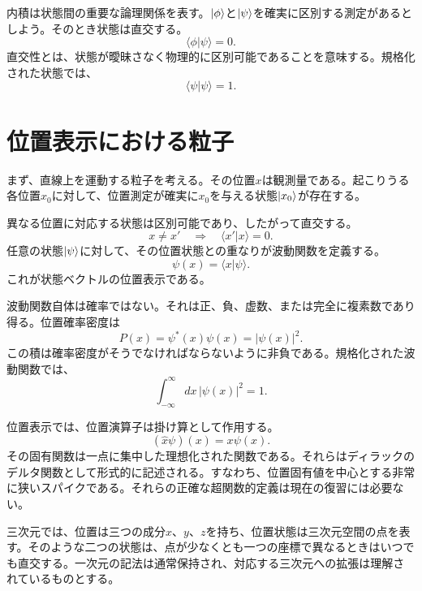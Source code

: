 内積は状態間の重要な論理関係を表す。\(\left\lvert\phi\right\rangle\)と\(\left\lvert\psi\right\rangle\)を確実に区別する測定があるとしよう。そのとき状態は直交する。
\begin{equation}
\langle\phi|\psi\rangle=0.
\end{equation}
直交性とは、状態が曖昧さなく物理的に区別可能であることを意味する。規格化された状態では、
\begin{equation}
\langle\psi|\psi\rangle=1.
\end{equation}

\section{位置表示における粒子}

まず、直線上を運動する粒子を考える。その位置\(x\)は観測量である。起こりうる各位置\(x_0\)に対して、位置測定が確実に\(x_0\)を与える状態\(\left\lvert x_0\right\rangle\)が存在する。

異なる位置に対応する状態は区別可能であり、したがって直交する。
\begin{equation}
x\neq x'
\quad\Longrightarrow\quad
\langle x'|x\rangle=0.
\end{equation}
任意の状態\(\left\lvert\psi\right\rangle\)に対して、その位置状態との重なりが波動関数を定義する。
\begin{equation}
\psi(x)=\langle x|\psi\rangle.
\end{equation}
これが状態ベクトルの位置表示である。

波動関数自体は確率ではない。それは正、負、虚数、または完全に複素数であり得る。位置確率密度は
\begin{equation}
P(x)=\psi^*(x)\psi(x)=|\psi(x)|^2.
\end{equation}
この積は確率密度がそうでなければならないように非負である。規格化された波動関数では、
\begin{equation}
\int_{-\infty}^{\infty}dx\,|\psi(x)|^2=1.
\end{equation}

位置表示では、位置演算子は掛け算として作用する。
\begin{equation}
(\hat x\psi)(x)=x\psi(x).
\end{equation}
その固有関数は一点に集中した理想化された関数である。それらはディラックのデルタ関数として形式的に記述される。すなわち、位置固有値を中心とする非常に狭いスパイクである。それらの正確な超関数的定義は現在の復習には必要ない。

三次元では、位置は三つの成分\(x\)、\(y\)、\(z\)を持ち、位置状態は三次元空間の点を表す。そのような二つの状態は、点が少なくとも一つの座標で異なるときはいつでも直交する。一次元の記法は通常保持され、対応する三次元への拡張は理解されているものとする。

